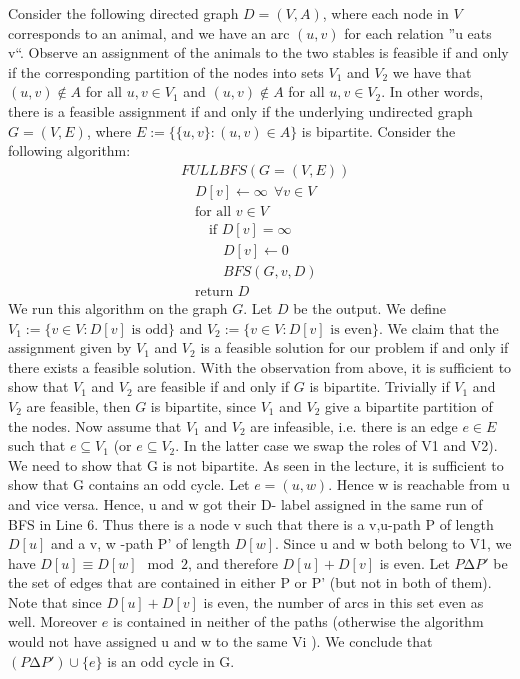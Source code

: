 \documentclass[11pt]{article}
\begin{document}
\begin{enumerate}[1)]
\begin{solution}
Consider the following directed graph $D = (V, A)$, where each node in $V$ corresponds to an
animal, and we have an arc $(u, v)$ for each relation ”u eats v“. Observe an assignment of the
animals to the two stables is feasible if and only if the corresponding partition of the nodes
into sets $V_1$ and $V_2$ we have that $(u, v) ∉ A$ for all $u, v ∈ V_1$ and $(u, v) ∉ A$ for all $u, v ∈ V_2$.
In other words, there is a feasible assignment if and only if the underlying undirected
graph $G= (V,E )$, where $E := \{\{u, v\} : (u, v) ∈ A\}$ is bipartite.
Consider the following algorithm:
\begin{align*}
&FULLBFS(G= (V,E )) \\
& \quad D[v] \leftarrow \infty \ \ ∀v ∈ V \\
& \quad \text{for all }v ∈ V \\
& \quad \quad \text{if } D[v]= \infty \\
&\quad \quad \quad D[v]\leftarrow 0 \\
& \quad \quad \quad BFS(G, v, D) \\
& \quad \text{return } D
\end{align*}
We run this algorithm on the graph $G$. Let $D$ be the output. We define
$V_1 := \{v ∈ V : D[v]\text{ is odd}\}$
and
$V_2 := \{v ∈ V : D[v]\text{ is even}\}$.
We claim that the assignment given by $V_1$ and $V_2$ is a feasible solution for our problem if and
only if there exists a feasible solution. With the observation from above, it is sufficient to
show that $V_1$ and $V_2$ are feasible if and only if $G$ is bipartite.
Trivially if $V_1$ and $V_2$ are feasible, then $G$ is bipartite, since $V_1$ and $V_2$ give a bipartite partition of the nodes.
Now assume that $V_1$ and $V_2$ are infeasible, i.e. there is an edge $e ∈ E$ such that $e ⊆ V_1$ (or
$e ⊆ V_2$. In the latter case we swap the roles of V1 and V2). We need to show that G is not
bipartite. As seen in the lecture, it is sufficient to show that G contains an odd cycle.
Let $e = (u, w )$. Hence w is reachable from u and vice versa. Hence, u and w got their D-
label assigned in the same run of BFS in Line 6. Thus there is a node v such that there is a
v,u-path P of length $D[u]$ and a v, w -path P' of length $D[w ]$. Since u and w both belong to
V1, we have $D[u] ≡ D[w ] \mod 2$, and therefore $D[u] + D[v]$ is even. Let $P ∆P'$ be the set of
edges that are contained in either P or P' (but not in both of them). Note that since $D[u] +
D[v]$ is even, the number of arcs in this set even as well. Moreover $e$ is contained in neither
of the paths (otherwise the algorithm would not have assigned u and w to the same Vi ).
We conclude that $(P ∆P') ∪ \{e\}$ is an odd cycle in G.


\end{solution}
\end{enumerate}
\end{document}
